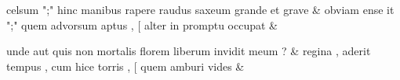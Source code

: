 \documentclass[12pt,onecolumn,twoside,a4paper]{memoir}
\begin{document}
\begin{pairs}
\begin{Leftside}
                              celsum
                              ";"
                              hinc
                              manibus
                              rapere
                              raudus
                              saxeum
                              grande
                              et
                              grave \&
                         \stanza {}
                     obviam
                              ense
                              it
                              ";"
                              quem
                              advorsum
                              aptus
                              ,
                              [
                              alter
                              in
                              promptu
                              occupat \&
                         \stanza {}
                     
                              unde
                              aut
                              quis
                              non
                              mortalis
                              florem
                              liberum
                              invidit
                              meum
                              ? \&
                         \stanza {}
                     regina
                              ,
                              aderit
                              tempus
                              ,
                              cum
                              hice
                              torris
                              ,
                              [
                              quem
                              amburi
                              vides \&
                     
                  \endnumbering
		\end{Leftside}
                  \begin{Rightside}
			\beginnumbering
			\numberstanzafalse
                     

\end{Rightside}
\end{pairs}
\end{document}
